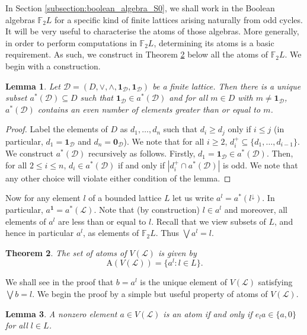 \documentclass[a4paper, 11pt]{article}
\theoremstyle{plain}
\newtheorem{theorem}{Theorem}[section]
\newtheorem{lemma}      [theorem]{Lemma}
\theoremstyle{definition}
\newcommand{\F} {\mathbb{F}}
\newcommand{\meet}      {\land}
\newcommand{\zero}      {\mathbf{0}}
\newcommand{\one}       {\mathbf{1}}
\newcommand{\Atoms}     {\mathrm{A}}
\begin{document}
In Section \ref{subsection:boolean_algebra_S0}, we shall work in the Boolean algebras $\F_2 L$ for a specific kind of finite lattices arising naturally from odd cycles. It will be very useful to characterise the atoms of those algebras. More generally, in order to perform computations in $\F_2 L$, determining its atoms is a basic requirement. As such, we construct in Theorem \ref{theorem:atoms} below all the atoms of $\F_2 L$. We begin with a construction.


\begin{lemma} \label{lemma:a_star}
Let $\mathcal{D} = (D, \vee, \meet, \one_\mathcal{D}, \one_\mathcal{D})$ be a finite lattice. Then there is a unique subset $a^*( \mathcal{D} ) \subseteq D$ such that $\one_\mathcal{D} \in a^*( \mathcal{D} )$ and for all $m \in D$ with $m \ne \one_\mathcal{D}$, $a^*( \mathcal{D} )$ contains an even number of elements greater than or equal to $m$.
\end{lemma}

\begin{proof}
Label the elements of $D$ as $d_1, \dots, d_n$ such that $d_i \ge d_j$ only if $i \le j$ (in particular, $d_1 = \one_\mathcal{D}$ and $d_n = \zero_\mathcal{D}$). We note that for all $i \ge 2$, $d_i^+ \subseteq \{ d_1, \dots, d_{i-1} \}$. We construct $a^*( \mathcal{D} )$ recursively as follows. Firstly, $d_1=\one_\mathcal{D} \in a^*( \mathcal{D} )$. Then, for all $2 \le i \le n$, $d_i \in a^*( \mathcal{D} )$ if and only if $|d_i^+ \cap a^*( \mathcal{D} )|$ is odd. We note that any other choice will violate either condition of the lemma.
\end{proof}


Now for any element $l$ of a bounded lattice $L$ let us write $a^l = a^*( l^\downarrow )$. In particular, $a^\one = a^*(\mathcal{L} )$. Note that (by construction) $l \in a^l$ and moreover, all elements of $a^l$ are less than or equal to $l$. Recall that we view subsets of $L$, and hence in particular $a^l$, as  elements of $\mathbb{F}_2L$.  Thus $\bigvee a^l = l$.


\begin{theorem} \label{theorem:atoms}
The set of atoms of $V( \mathcal{L} )$ is given by
\[
    \Atoms( V( \mathcal{L} ) ) = \{ a^l : l \in L \}.
\]
\end{theorem}
We shall see in the proof that  $b=a^l$ is the unique element of $V(\mathcal{L})$ satisfying $\bigvee b =l$.
We begin the proof by a simple but useful property of atoms of $V( \mathcal{L} )$.

\begin{lemma} \label{lemma:a_atom}
A nonzero element $a \in V( \mathcal{L} )$ is an atom if and only if $e_l a \in \{a, 0\}$ for all $l \in L$. 
\end{lemma}
\end{document}
